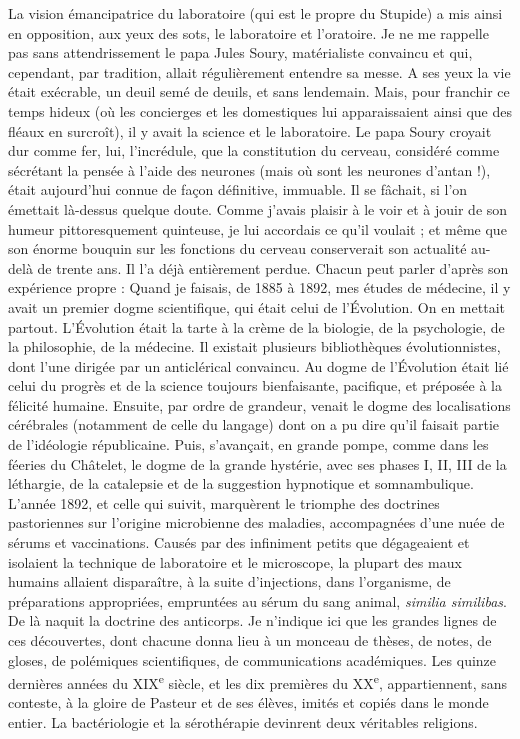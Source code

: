 \documentclass[french,twoside]{book} %
\begin{document}
La vision émancipatrice du laboratoire (qui est le propre du Stupide) a mis ainsi en opposition, aux yeux des sots, le laboratoire et l’oratoire. Je ne me rappelle pas sans attendrissement le papa Jules Soury, matérialiste convaincu et qui, cependant, par tradition, allait régulièrement entendre sa messe. A ses yeux la vie était exécrable, un deuil semé de deuils, et sans lendemain. Mais, pour franchir ce temps hideux (où les concierges et les domestiques lui apparaissaient ainsi que des fléaux en surcroît), il y avait la science et le laboratoire. Le papa Soury croyait dur comme fer, lui, l’incrédule, que la constitution du cerveau, considéré comme sécrétant la pensée à l’aide des neurones (mais où sont les neurones d’antan !), était aujourd’hui connue de façon définitive, immuable. Il se fâchait, si l’on émettait là-dessus quelque doute. Comme j’avais plaisir à le voir et à jouir de son humeur pittoresquement quinteuse, je lui accordais ce qu’il voulait ; et même que son énorme bouquin sur les fonctions du cerveau conserverait son actualité au-delà de trente ans. Il l’a déjà entièrement perdue. Chacun peut parler d’après son expérience propre : Quand je faisais, de 1885 à 1892, mes études de médecine, il y avait un premier dogme scientifique, qui était celui de l’Évolution. On en mettait partout. L’Évolution était la tarte à la crème de la biologie, de la psychologie, de la philosophie, de la médecine. Il existait plusieurs bibliothèques évolutionnistes, dont l’une dirigée par un anticlérical convaincu. Au dogme de l’Évolution était lié celui du progrès et de la science toujours bienfaisante, pacifique, et préposée à la félicité humaine. Ensuite, par ordre de grandeur, venait le dogme des localisations cérébrales (notamment de celle du langage) dont on a pu dire qu’il faisait partie de l’idéologie républicaine. Puis, s’avançait, en grande pompe, comme dans les féeries du Châtelet, le dogme de la grande hystérie, avec ses phases I, II, III de la léthargie, de la catalepsie et de la suggestion hypnotique et somnambulique. L’année 1892, et celle qui suivit, marquèrent le triomphe des doctrines pastoriennes sur l’origine microbienne des maladies, accompagnées d’une nuée de sérums et vaccinations. Causés par des infiniment petits que dégageaient et isolaient la technique de laboratoire et le microscope, la plupart des maux humains allaient disparaître, à la suite d’injections, dans l’organisme, de préparations appropriées, empruntées au sérum du sang animal, {\itshape similia similibas}. De là naquit la doctrine des anticorps. Je n’indique ici que les grandes lignes de ces découvertes, dont chacune donna lieu à un monceau de thèses, de notes, de gloses, de polémiques scientifiques, de communications académiques. Les quinze dernières années du XIX\textsuperscript{e} siècle, et les dix premières du XX\textsuperscript{e}, appartiennent, sans conteste, à la gloire de Pasteur et de ses élèves, imités et copiés dans le monde entier. La bactériologie et la sérothérapie devinrent deux véritables religions.\par
\end{document}

